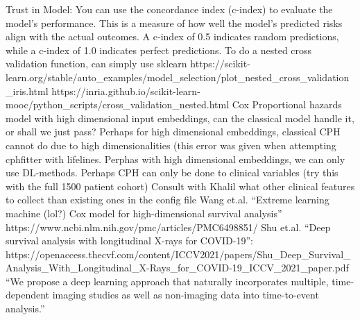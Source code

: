\documentclass{article}%
\begin{document}
%
Trust in Model: You can use the concordance index (c{-}index) to evaluate the model's performance. This is a measure of how well the model's predicted risks align with the actual outcomes. A c{-}index of 0.5 indicates random predictions, while a c{-}index of 1.0 indicates perfect predictions.%
\newline%
\newline%
%
%
\newline%
\newline%
%
To do a nested cross validation function, can simply use sklearn %
\newline%
\newline%
%
https://scikit{-}learn.org/stable/auto\_examples/model\_selection/plot\_nested\_cross\_validation\_iris.html%
\newline%
\newline%
%
https://inria.github.io/scikit{-}learn{-}mooc/python\_scripts/cross\_validation\_nested.html%
\newline%
\newline%
%
Cox Proportional hazards model with high dimensional input embeddings, can the classical model handle it, or shall we just pass?%
\newline%
\newline%
%
Perhaps for high dimensional embeddings, classical CPH cannot do due to high dimensionalities (this error was given when attempting cphfitter with lifelines. Perphas with high dimensional embeddings, we can only use DL{-}methods. %
\newline%
\newline%
%
Perhaps CPH can only be done to clinical variables (try this with the full 1500 patient cohort) %
\newline%
\newline%
%
Consult with Khalil what other clinical features to collect than existing ones in the config file %
\newline%
\newline%
%
Wang et.al. “Extreme learning machine (lol?) Cox model for high{-}dimensional survival analysis” https://www.ncbi.nlm.nih.gov/pmc/articles/PMC6498851/ %
\newline%
\newline%
%
Shu et.al. “Deep survival analysis with longitudinal X{-}rays for COVID{-}19”: https://openaccess.thecvf.com/content/ICCV2021/papers/Shu\_Deep\_Survival\_Analysis\_With\_Longitudinal\_X{-}Rays\_for\_COVID{-}19\_ICCV\_2021\_paper.pdf  “We propose a deep learning approach that naturally incorporates multiple, time{-}dependent imaging studies as well as non{-}imaging data into time{-}to{-}event analysis.”%
\end{document}
